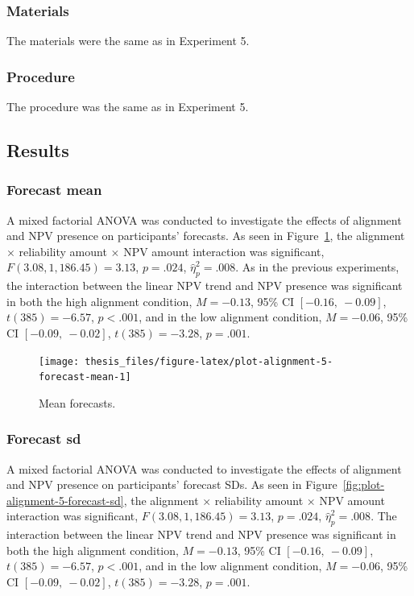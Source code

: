 \documentclass[a4paper, nobind, dvipsnames]{templates/ociamthesis}
\theoremstyle{definition}
\theoremstyle{definition}
\theoremstyle{definition}
\theoremstyle{definition}
\theoremstyle{remark}
\begin{document}
\subsubsection{Materials}

The materials were the same as in Experiment 5.

\subsubsection{Procedure}

The procedure was the same as in Experiment 5.

\subsection{Results}

\subsubsection{Forecast mean}

A mixed factorial ANOVA was conducted to investigate the effects of alignment
and NPV presence on participants' forecasts. As seen in
Figure~\ref{fig:plot-alignment-5-forecast-mean}, the alignment \(\times\)
reliability amount \(\times\) NPV amount interaction was significant,
\(F(3.08, 1,186.45) = 3.13\), \(p = .024\), \(\hat{\eta}^2_p = .008\).
As in the previous experiments, the interaction between the linear
NPV trend and NPV presence was significant in both the high alignment condition,
\(M = -0.13\), 95\% CI \([-0.16,~-0.09]\), \(t(385) = -6.57\), \(p < .001\), and in the
low alignment condition,
\(M = -0.06\), 95\% CI \([-0.09,~-0.02]\), \(t(385) = -3.28\), \(p = .001\).



\begin{figure}
\texttt{[image: thesis\_files/figure-latex/plot-alignment-5-forecast-mean-1]} \caption{Mean forecasts.}\label{fig:plot-alignment-5-forecast-mean}
\end{figure}

\hypertarget{forecast-sd-alignment-5}{%
\subsubsection{Forecast sd}\label{forecast-sd-alignment-5}}

A mixed factorial ANOVA was conducted to investigate the effects of alignment
and NPV presence on participants' forecast SDs. As seen in
Figure~\ref{fig:plot-alignment-5-forecast-sd}, the alignment \(\times\)
reliability amount \(\times\) NPV amount interaction was significant,
\(F(3.08, 1,186.45) = 3.13\), \(p = .024\), \(\hat{\eta}^2_p = .008\).
The interaction between the linear NPV trend and NPV presence was significant in
both the high alignment condition,
\(M = -0.13\), 95\% CI \([-0.16,~-0.09]\), \(t(385) = -6.57\), \(p < .001\), and in the
low alignment condition,
\(M = -0.06\), 95\% CI \([-0.09,~-0.02]\), \(t(385) = -3.28\), \(p = .001\).
\end{document}
